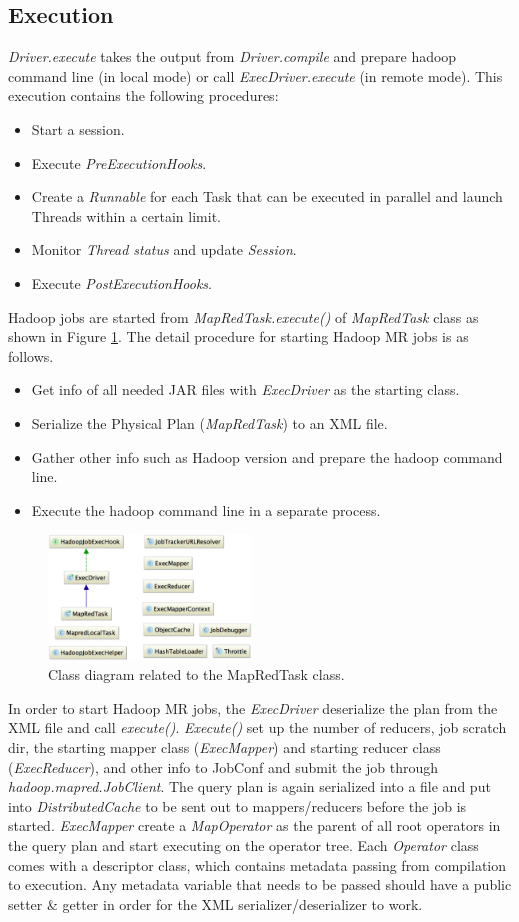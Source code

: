 \documentclass[twocolumn]{article}
\newcommand{\bi}{\begin{itemize}}
\newcommand{\ei}{\end{itemize}}
\newcommand{\ii}{\item}
\begin{document}
\subsection{Execution}
\textit{Driver.execute} takes the output from \textit{Driver.compile} and prepare hadoop command line (in local mode) or call \textit{ExecDriver.execute} (in remote mode).
This execution contains the following procedures:
\bi
\ii Start a session.
\ii Execute \textit{PreExecutionHooks}.
\ii Create a \textit{Runnable} for each Task that can be executed in parallel and launch Threads within a certain limit.
\ii Monitor \textit{Thread status} and update \textit{Session}.
\ii Execute \textit{PostExecutionHooks}.
\ei
Hadoop jobs are started from \textit{MapRedTask.execute()} of \textit{MapRedTask} class as shown in Figure \ref{fig04}. 
The detail procedure for starting Hadoop MR jobs is as follows.
\bi
\ii Get info of all needed JAR files with \textit{ExecDriver} as the starting class.
\ii Serialize the Physical Plan (\textit{MapRedTask}) to an XML file.
\ii Gather other info such as Hadoop version and prepare the hadoop command line.
\ii Execute the hadoop command line in a separate process.
\ei 
\begin{figure}[htb]
        \centering
        \includegraphics[width=0.48\textwidth]{mapredtask.png}
        \caption{Class diagram related to the MapRedTask class.}
        \label{fig04}
\end{figure}

In order to start Hadoop MR jobs, the \textit{ExecDriver} deserialize the plan from the XML file and call \textit{execute()}.
\textit{Execute()} set up the number of reducers, job scratch dir, the starting mapper class (\textit{ExecMapper}) and starting reducer class (\textit{ExecReducer}), and other info to JobConf and submit the job through \textit{hadoop.mapred.JobClient}.
The query plan is again serialized into a file and put into \textit{DistributedCache} to be sent out to mappers/reducers before the job is started.
\textit{ExecMapper} create a \textit{MapOperator} as the parent of all root operators in the query plan and start executing on the operator tree.
Each \textit{Operator} class comes with a descriptor class, which contains metadata passing from compilation to execution.
Any metadata variable that needs to be passed should have a public setter \& getter in order for the XML serializer/deserializer to work.
\end{document}
